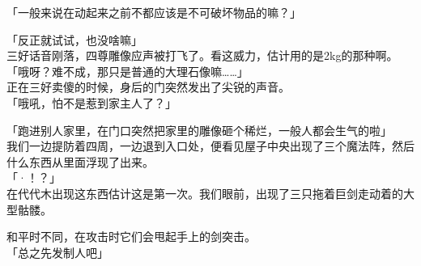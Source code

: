 「一般来说在动起来之前不都应该是不可破坏物品的嘛？」

「反正就试试，也没啥嘛」\\

三好话音刚落，四尊雕像应声被打飞了。看这威力，估计用的是2kg的那种啊。\\

「哦呀？难不成，那只是普通的大理石像嘛……」\\

正在三好卖傻的时候，身后的门突然发出了尖锐的声音。\\

「哦吼，怕不是惹到家主人了？」

「跑进别人家里，在门口突然把家里的雕像砸个稀烂，一般人都会生气的啦」\\

我们一边提防着四周，一边退到入口处，便看见屋子中央出现了三个魔法阵，然后什么东西从里面浮现了出来。\\

「·！？」\\

在代代木出现这东西估计这是第一次。我们眼前，出现了三只拖着巨剑走动着的大型骷髅。

和平时不同，在攻击时它们会甩起手上的剑突击。\\

「总之先发制人吧」\\

